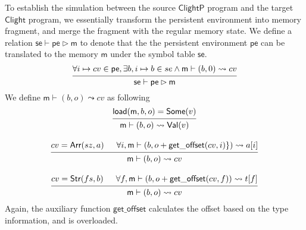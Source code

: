 \documentclass[acmsmall,screen,review,anonymous]{acmart}
\newcommand{\kw}[1]{\ensuremath{ \mathsf{#1} }}
\newcommand{\ClightP}{\ensuremath{ \mathsf{ClightP} }}
\newcommand{\Clight}{\ensuremath{ \mathsf{Clight} }}
\begin{document}
To establish the simulation between
the source $\ClightP$ program and the target $\Clight$ program,
we essentially transform the persistent environment into memory fragment,
and merge the fragment with the regular memory state.
We define a relation $\kw{se} \vdash \kw{pe} \rhd \kw{m}$
to denote that the the persistent environment $\kw{pe}$ can be translated to
the memory $\kw{m}$ under the symbol table $\kw{se}$.
\[
  \begin{prooftree}
    \hypo{\forall i \mapsto cv \in \kw{pe}, \exists b,  i \mapsto b \in se \wedge
      \kw{m} \vdash (b,0) \leadsto cv}
    \infer1{\kw{se} \vdash \kw{pe} \rhd \kw{m}}
  \end{prooftree}
\]
We define $\kw{m} \vdash (b, o) \leadsto cv$ as following
\begin{gather*}
  {
  \begin{prooftree}
    \hypo{\kw{load}(\kw{m}, b, o) = \kw{Some}(v)}
    \infer1{\kw{m} \vdash (b, o) \leadsto \kw{Val}(v)}
  \end{prooftree}
  }
  \\[1em]
  {
  \begin{prooftree}
    \hypo{cv = \kw{Arr}(sz, a)}
    \hypo{\forall i, \kw{m} \vdash (b, o+\kw{get\_offset}(cv, i)\}) \leadsto a[i]}
    \infer2{\kw{m} \vdash (b, o) \leadsto cv}
  \end{prooftree}
  }
  \\[1em]
  {
  \begin{prooftree}
    \hypo{cv = \kw{Str}(fs, b)}
    \hypo{\forall f, \kw{m} \vdash (b, o+\kw{get\_offset}(cv, f)) \leadsto t[f]}
    \infer2{\kw{m} \vdash (b, o) \leadsto cv}
  \end{prooftree}
  }
\end{gather*}
Again, the auxiliary function $\kw{get\_offset}$
calculates the offset based on the type information,
and is overloaded.
\end{document}
